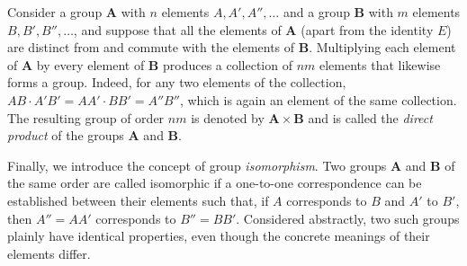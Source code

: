 Consider a group $\boldsymbol{A}$ with $n$ elements $A,A',A'',\ldots$ and a group $\boldsymbol{B}$ with $m$ elements $B,B',B'',\ldots$, and suppose that all the elements of $\boldsymbol{A}$ (apart from the identity $E$) are distinct from and commute with the elements of $\boldsymbol{B}$. Multiplying each element of $\boldsymbol{A}$ by every element of $\boldsymbol{B}$ produces a collection of $nm$ elements that likewise forms a group. Indeed, for any two elements of the collection,
$AB\cdot A'B'=AA'\cdot BB'=A''B''$, which is again an element of the same collection. The resulting group of order $nm$ is denoted by $\boldsymbol{A}\times\boldsymbol{B}$ and is called the \emph{direct product} of the groups $\boldsymbol{A}$ and $\boldsymbol{B}$.

Finally, we introduce the concept of group \emph{isomorphism}. Two groups $\boldsymbol{A}$ and $\boldsymbol{B}$ of the same order are called isomorphic if a one-to-one correspondence can be established between their elements such that, if $A$ corresponds to $B$
and $A'$ to $B'$, then $A''=AA'$ corresponds to $B''=BB'$. Considered abstractly, two such groups plainly have identical properties, even though the concrete meanings of their elements differ.
